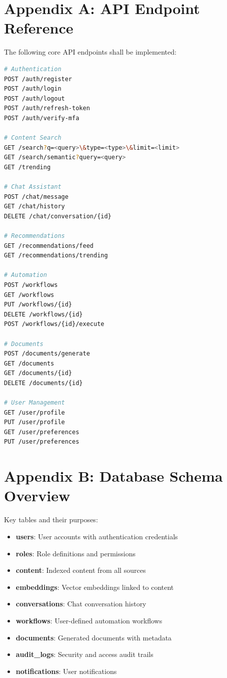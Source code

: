 \documentclass{report}
\begin{document}
\section{Appendix A: API Endpoint Reference}

The following core API endpoints shall be implemented:

\begin{lstlisting}[language=bash]
# Authentication
POST /auth/register
POST /auth/login
POST /auth/logout
POST /auth/refresh-token
POST /auth/verify-mfa

# Content Search
GET /search?q=<query>\&type=<type>\&limit=<limit>
GET /search/semantic?query=<query>
GET /trending

# Chat Assistant
POST /chat/message
GET /chat/history
DELETE /chat/conversation/{id}

# Recommendations
GET /recommendations/feed
GET /recommendations/trending

# Automation
POST /workflows
GET /workflows
PUT /workflows/{id}
DELETE /workflows/{id}
POST /workflows/{id}/execute

# Documents
POST /documents/generate
GET /documents
GET /documents/{id}
DELETE /documents/{id}

# User Management
GET /user/profile
PUT /user/profile
GET /user/preferences
PUT /user/preferences
\end{lstlisting}

\section{Appendix B: Database Schema Overview}

Key tables and their purposes:

\begin{itemize}
    \item \textbf{users}: User accounts with authentication credentials
    \item \textbf{roles}: Role definitions and permissions
    \item \textbf{content}: Indexed content from all sources
    \item \textbf{embeddings}: Vector embeddings linked to content
    \item \textbf{conversations}: Chat conversation history
    \item \textbf{workflows}: User-defined automation workflows
    \item \textbf{documents}: Generated documents with metadata
    \item \textbf{audit\_logs}: Security and access audit trails
    \item \textbf{notifications}: User notifications
\end{itemize}
\end{document}
